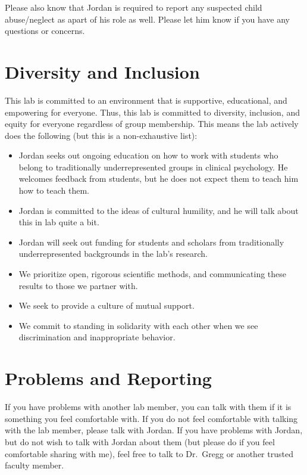 \documentclass[
]{book}
\providecommand{\tightlist}{%
  \setlength{\itemsep}{0pt}\setlength{\parskip}{0pt}}
\begin{document}
Please also know that Jordan is required to report any suspected child abuse/neglect as apart of his role as well. Please let him know if you have any questions or concerns.

\hypertarget{diversity-and-inclusion}{%
\section{Diversity and Inclusion}\label{diversity-and-inclusion}}

This lab is committed to an environment that is supportive, educational, and empowering for everyone. Thus, this lab is committed to diversity, inclusion, and equity for everyone regardless of group membership. This means the lab actively does the following (but this is a non-exhaustive list):

\begin{itemize}
\tightlist
\item
  Jordan seeks out ongoing education on how to work with students who belong to traditionally underrepresented groups in clinical psychology. He welcomes feedback from students, but he does not expect them to teach him how to teach them.
\item
  Jordan is committed to the ideas of cultural humility, and he will talk about this in lab quite a bit.
\item
  Jordan will seek out funding for students and scholars from traditionally underrepresented backgrounds in the lab's research.
\item
  We prioritize open, rigorous scientific methods, and communicating these results to those we partner with.
\item
  We seek to provide a culture of mutual support.
\item
  We commit to standing in solidarity with each other when we see discrimination and inappropriate behavior.
\end{itemize}

\hypertarget{problems-and-reporting}{%
\section{Problems and Reporting}\label{problems-and-reporting}}

If you have problems with another lab member, you can talk with them if it is something you feel comfortable with. If you do not feel comfortable with talking with the lab member, please talk with Jordan. If you have problems with Jordan, but do not wish to talk with Jordan about them (but please do if you feel comfortable sharing with me), feel free to talk to Dr.~Gregg or another trusted faculty member.
\end{document}
